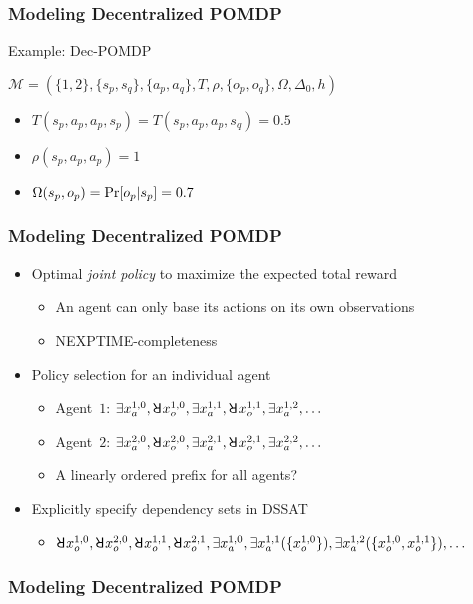 \begin{frame}
      \frametitle{Modeling Decentralized POMDP}
      \begin{block}{Example: Dec-POMDP}
            \begin{figure}
                  \centering
                  
            \end{figure}
            $\mathcal{M}=(\{1,2\},\{s_p,s_q\},\{a_p,a_q\},T,\rho,\{o_p,o_q\},\Omega,\Delta_0,h)$
            \begin{itemize}
                  \item $T(s_p,a_p,a_p,s_p)=T(s_p,a_p,a_p,s_q)=0.5$
                  \item $\rho(s_p,a_p,a_p)=1$
                  \item $\Omega(s_p,o_p)=\Pr[o_p|s_p]=0.7$
            \end{itemize}
      \end{block}
\end{frame}

\begin{frame}
      \frametitle{Modeling Decentralized POMDP}
      \begin{itemize}
            \item Optimal \emph{joint policy} to maximize the expected total reward
                  \begin{itemize}
                        \item An agent can only base its actions on \alert{its own observations}
                        \item NEXPTIME-completeness~\cite{Bernstein2002}
                  \end{itemize}
                  \pause
            \item Policy selection for an individual agent~\cite{Salmon2020}
                  \begin{itemize}
                        \item Agent~$1$: $\exists x_a^{1,0},\random{} x_o^{1,0},\exists x_a^{1,1},\random{} x_o^{1,1},\exists x_a^{1,2},\ldots$
                        \item Agent~$2$: $\exists x_a^{2,0},\random{} x_o^{2,0},\exists x_a^{2,1},\random{} x_o^{2,1},\exists x_a^{2,2},\ldots$
                        \item A linearly ordered prefix for all agents?
                  \end{itemize}
                  \pause
            \item Explicitly specify dependency sets in DSSAT
                  \begin{itemize}
                        \item $\random{}x_o^{1,0},\random{}x_o^{2,0},\random{}x_o^{1,1},\random{}x_o^{2,1},\exists x_a^{1,0},\exists x_a^{1,1}(\{x_o^{1,0}\}),\exists x_a^{1,2}(\{x_o^{1,0},x_o^{1,1}\}),\ldots$
                  \end{itemize}
      \end{itemize}
\end{frame}

\begin{frame}
      \frametitle{Modeling Decentralized POMDP}
      \begin{center}
            
      \end{center}
\end{frame}